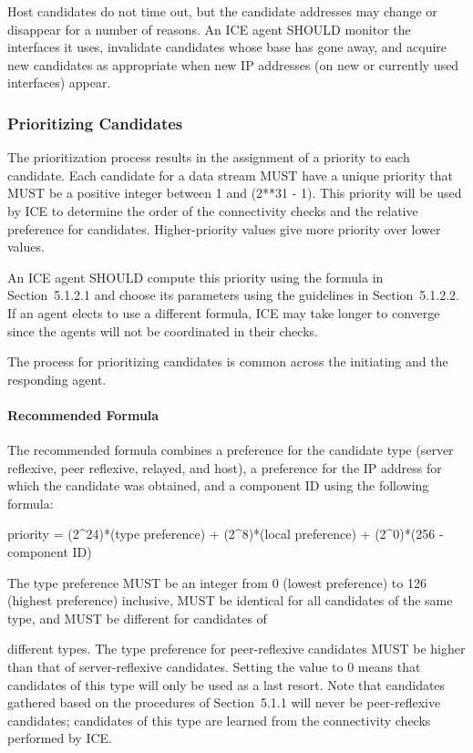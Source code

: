 \documentclass{article}
\begin{document}
Host candidates do not time out, but the candidate addresses may change or disappear for a number of reasons.  An ICE agent SHOULD monitor the interfaces it uses, invalidate candidates whose base has gone away, and acquire new candidates as appropriate when new IP addresses (on new or currently used interfaces) appear.

\subsubsection{Prioritizing Candidates}

The prioritization process results in the assignment of a priority to each candidate.  Each candidate for a data stream MUST have a unique priority that MUST be a positive integer between 1 and (2**31 - 1). This priority will be used by ICE to determine the order of the connectivity checks and the relative preference for candidates. Higher-priority values give more priority over lower values.

An ICE agent SHOULD compute this priority using the formula in Section~5.1.2.1 and choose its parameters using the guidelines in Section~5.1.2.2.  If an agent elects to use a different formula, ICE may take longer to converge since the agents will not be coordinated in their checks.

The process for prioritizing candidates is common across the initiating and the responding agent.

\paragraph{Recommended Formula}

The recommended formula combines a preference for the candidate type (server reflexive, peer reflexive, relayed, and host), a preference for the IP address for which the candidate was obtained, and a component ID using the following formula:

priority = (2\textasciicircum{}24)*(type preference) + (2\textasciicircum{}8)*(local preference) + (2\textasciicircum{}0)*(256 - component ID)

The type preference MUST be an integer from 0 (lowest preference) to 126 (highest preference) inclusive, MUST be identical for all candidates of the same type, and MUST be different for candidates of

different types.  The type preference for peer-reflexive candidates MUST be higher than that of server-reflexive candidates.  Setting the value to 0 means that candidates of this type will only be used as a last resort.  Note that candidates gathered based on the procedures of Section~5.1.1 will never be peer-reflexive candidates; candidates of this type are learned from the connectivity checks performed by ICE.
\end{document}
